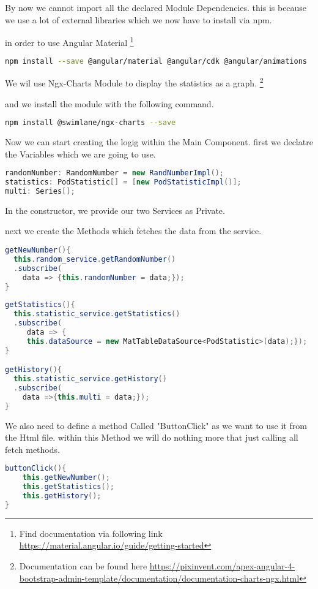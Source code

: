 By now we cannot import all the declared Module Dependencies. this is because we use a lot of external libraries which we now have to install via npm.

in order to use Angular Material \footnote{Find documentation via following link \url{https://material.angular.io/guide/getting-started}}
\begin{lstlisting}[language=Bash]
npm install --save @angular/material @angular/cdk @angular/animations 
\end{lstlisting}

We wil use Ngx-Charts Module to display the statistics as a graph.
\footnote{Documentation can be found here \url{https://pixinvent.com/apex-angular-4-bootstrap-admin-template/documentation/documentation-charts-ngx.html}}

and we install the module with the following command.
\begin{lstlisting}[language=Bash]
npm install @swimlane/ngx-charts --save
\end{lstlisting}

Now we can start creating the logig within the Main Component.
first we declatre the Variables which we are going to use.
\begin{lstlisting}[language=Java]
randomNumber: RandomNumber = new RandNumberImpl();
statistics: PodStatistic[] = [new PodStatisticImpl()];
multi: Series[];
\end{lstlisting}

In the constructor, we provide our two Services as Private.

next we create the Methods which fetches the data from the service.
\begin{lstlisting}[language=Java]
getNewNumber(){
  this.random_service.getRandomNumber()
  .subscribe(
    data => {this.randomNumber = data;});
}
  
getStatistics(){
  this.statistic_service.getStatistics()
  .subscribe(
     data => {
     this.dataSource = new MatTableDataSource<PodStatistic>(data);});
}

getHistory(){
  this.statistic_service.getHistory()
  .subscribe(
    data =>{this.multi = data;});
}
\end{lstlisting}

We also need to define a method Called "ButtonClick" as we want to use it from the Html file. within this Method we will do nothing more that just calling all fetch methods.
\begin{lstlisting}[language=Java]
buttonClick(){
    this.getNewNumber();
    this.getStatistics();
    this.getHistory();
}
\end{lstlisting}

